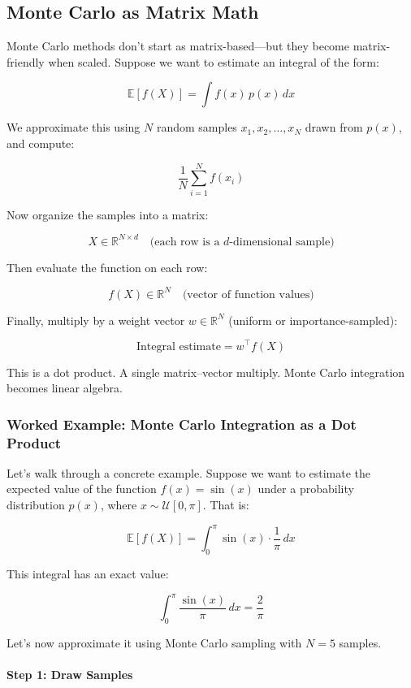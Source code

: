 \subsection{Monte Carlo as Matrix Math}

Monte Carlo methods don’t start as matrix-based—but they become matrix-friendly when scaled. Suppose we want to estimate an integral of the form:

\[
\mathbb{E}[f(X)] = \int f(x) \, p(x) \, dx
\]

We approximate this using \( N \) random samples \( x_1, x_2, \ldots, x_N \) drawn from \( p(x) \), and compute:

\[
\frac{1}{N} \sum_{i=1}^N f(x_i)
\]

Now organize the samples into a matrix:

\[
X \in \mathbb{R}^{N \times d} \quad \text{(each row is a $d$-dimensional sample)}
\]

Then evaluate the function on each row:

\[
f(X) \in \mathbb{R}^N \quad \text{(vector of function values)}
\]

Finally, multiply by a weight vector \( w \in \mathbb{R}^N \) (uniform or importance-sampled):

\[
\text{Integral estimate} = w^\top f(X)
\]

This is a dot product. A single matrix–vector multiply. Monte Carlo integration becomes linear algebra.


\subsubsection{Worked Example: Monte Carlo Integration as a Dot Product}

Let’s walk through a concrete example. Suppose we want to estimate the expected value of the function \( f(x) = \sin(x) \) under a probability distribution \( p(x) \), where \( x \sim \mathcal{U}[0, \pi] \). That is:

\[
\mathbb{E}[f(X)] = \int_0^\pi \sin(x) \cdot \frac{1}{\pi} \, dx
\]

This integral has an exact value:

\[
\int_0^\pi \frac{\sin(x)}{\pi} \, dx = \frac{2}{\pi}
\]

Let’s now approximate it using Monte Carlo sampling with \( N = 5 \) samples.

\paragraph{Step 1: Draw Samples}

